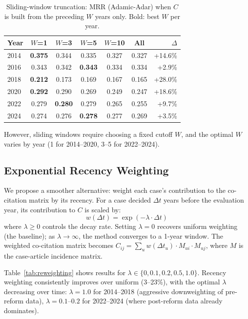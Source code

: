 \documentclass[11pt]{article}
\begin{document}
\begin{table}[t]
\centering
\small
\caption{Sliding-window truncation: MRR (Adamic-Adar) when $C$ is built from the preceding $W$ years only. Bold: best $W$ per year.}
\label{tab:mitigation}
\begin{tabular}{@{}l ccccc r@{}}
\toprule
\textbf{Year} & \textbf{$W$=1} & \textbf{$W$=3} & \textbf{$W$=5} & \textbf{$W$=10} & \textbf{All} & \textbf{$\Delta$} \\
\midrule
2014 & \textbf{0.375} & 0.344 & 0.335 & 0.327 & 0.327 & +14.6\% \\
2016 & 0.343 & 0.342 & \textbf{0.343} & 0.334 & 0.334 & +2.9\% \\
2018 & \textbf{0.212} & 0.173 & 0.169 & 0.167 & 0.165 & +28.0\% \\
2020 & \textbf{0.292} & 0.290 & 0.269 & 0.249 & 0.247 & +18.6\% \\
2022 & 0.279 & \textbf{0.280} & 0.279 & 0.265 & 0.255 & +9.7\% \\
2024 & 0.274 & 0.276 & \textbf{0.278} & 0.277 & 0.269 & +3.5\% \\
\bottomrule
\end{tabular}
\end{table}

However, sliding windows require choosing a fixed cutoff $W$, and the optimal $W$ varies by year (1 for 2014--2020, 3--5 for 2022--2024).

\subsection{Exponential Recency Weighting}

We propose a smoother alternative: weight each case's contribution to the co-citation matrix by its recency.
For a case decided $\Delta t$ years before the evaluation year, its contribution to $C$ is scaled by:
\begin{equation}
w(\Delta t) = \exp(-\lambda \cdot \Delta t)
\label{eq:reweighting}
\end{equation}
where $\lambda \geq 0$ controls the decay rate.
Setting $\lambda = 0$ recovers uniform weighting (the baseline); as $\lambda \to \infty$, the method converges to a 1-year window.
The weighted co-citation matrix becomes $C_{ij} = \sum_u w(\Delta t_u) \cdot M_{ui} \cdot M_{uj}$, where $M$ is the case-article incidence matrix.

Table~\ref{tab:reweighting} shows results for $\lambda \in \{0, 0.1, 0.2, 0.5, 1.0\}$.
Recency weighting consistently improves over uniform (3--23\%), with the optimal $\lambda$ decreasing over time: $\lambda = 1.0$ for 2014--2018 (aggressive downweighting of pre-reform data), $\lambda = 0.1$--$0.2$ for 2022--2024 (where post-reform data already dominates).
\end{document}
